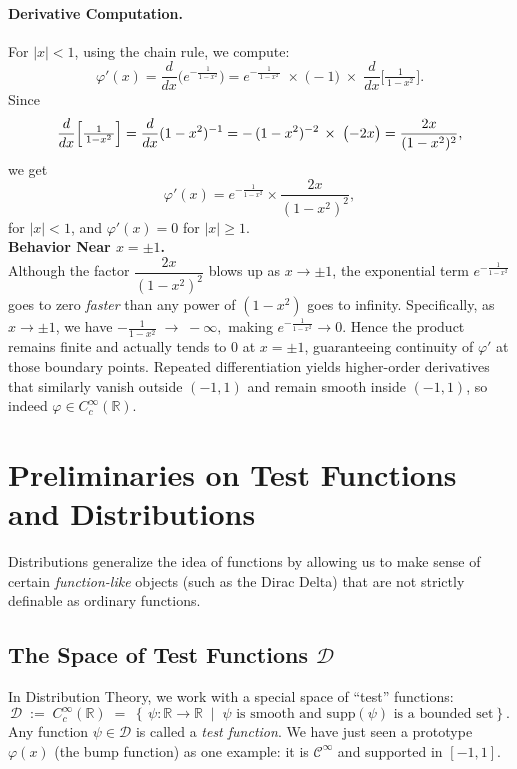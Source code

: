 \documentclass[11pt,openany]{book}
\begin{document}
\paragraph{Derivative Computation.}
For $|x| < 1$, using the chain rule, we compute:
\[
\varphi'(x)
= \frac{d}{dx} \bigl(e^{-\tfrac{1}{1 - x^2}}\bigr)
= e^{-\tfrac{1}{\,1 - x^2\,}}
   \;\times\;
   \bigl(-1\bigr)
   \;\times\;
   \frac{d}{dx}\bigl[\tfrac{1}{\,1 - x^2\,}\bigr].
\]
Since
\[
\frac{d}{dx}\Bigl[\tfrac{1}{\,1 - x^2\,}\Bigr]
= \frac{d}{dx}(1 - x^2)^{-1}
= -\, (1 - x^2)^{-2} \,\times\; \bigl(-2x\bigr)
= \frac{2x}{(1 - x^2)^2},
\]
we get
\[
\varphi'(x)
= e^{-\tfrac{1}{1 - x^2}}
  \times
  \frac{2x}{(1 - x^2)^2},
\]
for $|x|<1$, and $\varphi'(x)=0$ for $|x|\ge1$. \\
\medskip
\textbf{Behavior Near $x = \pm 1$.} \\
\noindent  Although the factor $\dfrac{2x}{(1 - x^2)^2}$ blows up as $x\to\pm 1$, the exponential term
$
e^{-\tfrac{1}{1 - x^2}}
$
goes to zero \emph{faster} than any power of $(1 - x^2)$ goes to infinity. Specifically, as $x \to \pm 1$, we have
$
-\frac{1}{1 - x^2}\;\to\; -\infty,
$
making $e^{-\frac{1}{1 - x^2}}\to 0$. Hence the product remains finite and actually tends to $0$ at $x=\pm 1$, guaranteeing continuity of $\varphi'$ at those boundary points. Repeated differentiation yields higher-order derivatives that similarly vanish outside $(-1,1)$ and remain smooth inside $(-1,1)$, so indeed $\varphi\in C^\infty_c(\mathbb{R})$.

\medskip
\begin{center}
  \hrulefill
\end{center}

\section{Preliminaries on Test Functions and Distributions}
\label{sec:testfunctions_distributions}

Distributions generalize the idea of functions by allowing us to make sense of certain \emph{function-like} objects (such as the Dirac Delta) that are not strictly definable as ordinary functions.

\subsection{The Space of Test Functions \texorpdfstring{$\mathcal{D}$}{D}}

\noindent
In Distribution Theory, we work with a special space of ``test'' functions:
\[
\mathcal{D} \;:=\; C_c^\infty(\mathbb{R})
\;=\;
\left\{\,
\psi \colon \mathbb{R}\to\mathbb{R}
 \;\middle|\;
 \psi \text{ is smooth and } \mathrm{supp}(\psi)\text{ is a bounded set}
\right\}.
\]
Any function $\psi \in \mathcal{D}$ is called a \emph{test function}.  We have just seen a prototype $\varphi(x)$ (the bump function) as one example: it is $\mathcal{C}^\infty$ and supported in $[-1,1]$.
\end{document}
